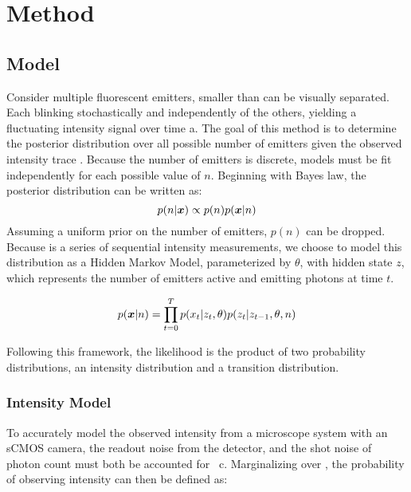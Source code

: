\section{Method}

\subsection{Model}
Consider multiple fluorescent emitters, smaller than can be visually separated.
  Each blinking stochastically and independently of the others, 
  yielding a fluctuating intensity signal over time a.
  The goal of this method is to determine the posterior distribution over all
  possible number of emitters given the observed intensity trace \trace.
  Because the number of emitters is discrete, models must be fit independently for each possible value of $n$.
  Beginning with Bayes law, the posterior distribution can be written as:
  \begin{equation*}
    p(n | \bm{x}) \propto p(n) p(\bm{x} | n)
  \end{equation*}
  Assuming a uniform prior on the number of emitters, $p(n)$ can be dropped.
  Because \trace is a series of sequential intensity measurements, 
    we choose to model this distribution as a Hidden Markov Model, parameterized by $\theta$,
     with hidden state $z$, which represents the number of emitters active and emitting photons at time $t$.
    
  \begin{equation}
    p(\bm{x}| n) = \prod_{t=0}^{T} p(x_{t} | z_{t}, \theta) p(z_{t} | z_{t-1}, \theta, n)
    \label{eq:method:HMM}
  \end{equation}

  Following this framework, the likelihood is the product of two probability distributions,
  an intensity distribution and a transition distribution. 

\subsubsection{Intensity Model}

To accurately model the observed intensity from a microscope system with an sCMOS camera, 
  the readout noise from the detector, and the shot noise of photon count must both be accounted for~\cite{huang_video-rate_2013} c.
  Marginalizing over \photons, the probability of observing intensity \x{} can then be defined as:


